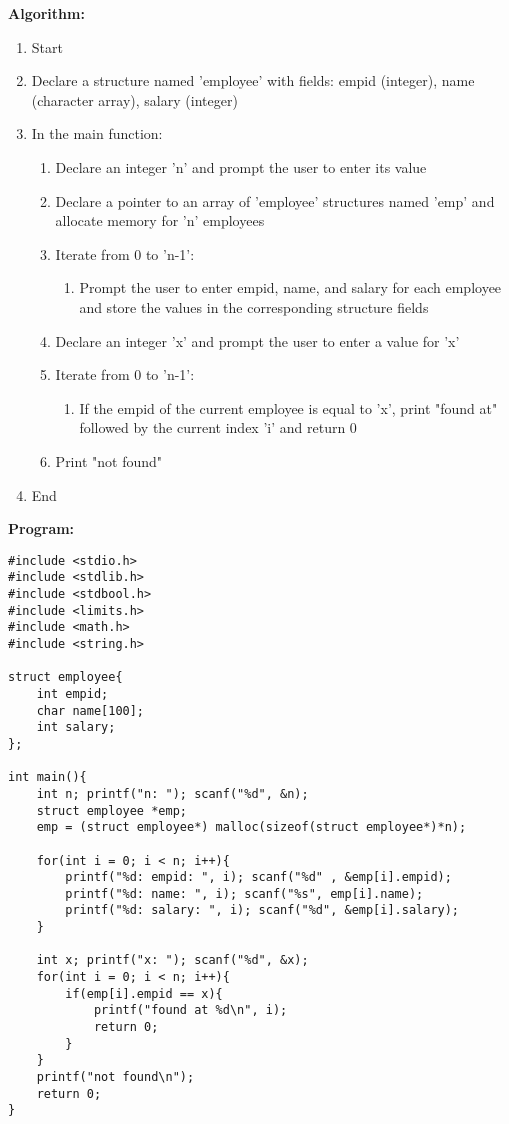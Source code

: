 \documentclass{article}
\begin{document}
\textbf{Algorithm:}
\begin{enumerate}
  \item Start
  \item Declare a structure named 'employee' with fields: empid (integer), name (character array), salary (integer)
  \item In the main function:
    \begin{enumerate}
      \item Declare an integer 'n' and prompt the user to enter its value
      \item Declare a pointer to an array of 'employee' structures named 'emp' and allocate memory for 'n' employees
      \item Iterate from 0 to 'n-1':
        \begin{enumerate}
          \item Prompt the user to enter empid, name, and salary for each employee and store the values in the corresponding structure fields
        \end{enumerate}
      \item Declare an integer 'x' and prompt the user to enter a value for 'x'
      \item Iterate from 0 to 'n-1':
        \begin{enumerate}
          \item If the empid of the current employee is equal to 'x', print "found at" followed by the current index 'i' and return 0
        \end{enumerate}
      \item Print "not found"
    \end{enumerate}
  \item End
\end{enumerate}

\textbf{Program:}
\begin{lstlisting}
#include <stdio.h>
#include <stdlib.h>
#include <stdbool.h>
#include <limits.h>
#include <math.h>
#include <string.h>

struct employee{
    int empid;
    char name[100];
    int salary;
};

int main(){
    int n; printf("n: "); scanf("%d", &n);
    struct employee *emp;
    emp = (struct employee*) malloc(sizeof(struct employee*)*n);

    for(int i = 0; i < n; i++){
        printf("%d: empid: ", i); scanf("%d" , &emp[i].empid);
        printf("%d: name: ", i); scanf("%s", emp[i].name);
        printf("%d: salary: ", i); scanf("%d", &emp[i].salary);
    }

    int x; printf("x: "); scanf("%d", &x);
    for(int i = 0; i < n; i++){
        if(emp[i].empid == x){
            printf("found at %d\n", i);
            return 0;
        }
    }
    printf("not found\n");
    return 0;
}
\end{lstlisting}
\end{document}
